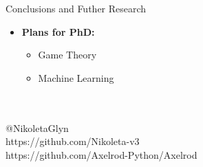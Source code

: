 \documentclass{beamer}
\begin{document}
\begin{frame}{Conclusions and Futher Research}
    \begin{itemize}
    \item \textbf{Plans for PhD:}
    \begin{itemize}[label={--}]
        \item Game Theory
        \item Machine Learning
    \end{itemize}
    \end{itemize}
\end{frame}

\begin{frame}
	\begin{center}
		\huge{\textbf{}}\\~\\
		\small{@NikoletaGlyn}\\
		\small{https://github.com/Nikoleta-v3}\\
		\small{https://github.com/Axelrod-Python/Axelrod}
	\end{center}
\end{frame}
\end{document}
